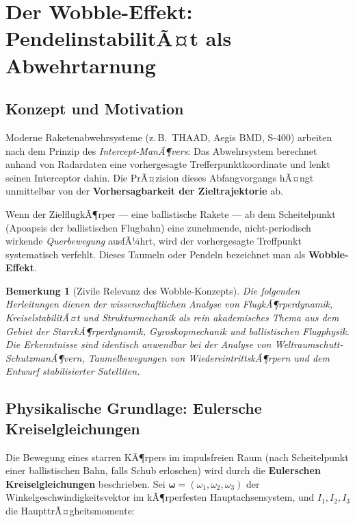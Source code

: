 ﻿\documentclass[12pt,a4paper]{article}
\newtheorem{bemerkung}{Bemerkung}[section]
\newcommand{\vek}[1]{\boldsymbol{#1}}
\begin{document}
\section{Der Wobble-Effekt: PendelinstabilitÃ¤t als Abwehrtarnung}

\subsection{Konzept und Motivation}

Moderne Raketenabwehrsysteme (z.\,B.\ THAAD, Aegis BMD, S-400) arbeiten nach dem
Prinzip des \emph{Intercept-ManÃ¶vers}: Das Abwehrsystem berechnet anhand von
Radardaten eine vorhergesagte Trefferpunktkoordinate und lenkt seinen Interceptor
dahin. Die PrÃ¤zision dieses Abfangvorgangs hÃ¤ngt unmittelbar von der
\textbf{Vorhersagbarkeit der Zieltrajektorie} ab.

Wenn der ZielflugkÃ¶rper --- eine ballistische Rakete --- ab dem Scheitelpunkt
(Apoapsis der ballistischen Flugbahn) eine zunehmende, nicht-periodisch wirkende
\emph{Querbewegung} ausfÃ¼hrt, wird der vorhergesagte Treffpunkt systematisch
verfehlt. Dieses Taumeln oder Pendeln bezeichnet man als \textbf{Wobble-Effekt}.

\begin{bemerkung}[Zivile Relevanz des Wobble-Konzepts]
Die folgenden Herleitungen dienen der wissenschaftlichen Analyse von
FlugkÃ¶rperdynamik, KreiselstabilitÃ¤t und Strukturmechanik als rein akademisches
Thema aus dem Gebiet der StarrkÃ¶rperdynamik, Gyroskopmechanik und ballistischen
Flugphysik. Die Erkenntnisse sind identisch anwendbar bei der Analyse von
Weltraumschutt-SchutzmanÃ¶vern, Taumelbewegungen von WiedereintrittskÃ¶rpern und
dem Entwurf stabilisierter Satelliten.
\end{bemerkung}

\subsection{Physikalische Grundlage: Eulersche Kreiselgleichungen}

Die Bewegung eines starren KÃ¶rpers im impulsfreien Raum (nach Scheitelpunkt einer
ballistischen Bahn, falls Schub erloschen) wird durch die \textbf{Eulerschen
Kreiselgleichungen} beschrieben. Sei $\vek{\omega} = (\omega_1, \omega_2, \omega_3)$
der Winkelgeschwindigkeitsvektor im kÃ¶rperfesten Hauptachsensystem, und
$I_1, I_2, I_3$ die HaupttrÃ¤gheitsmomente:
\end{document}
